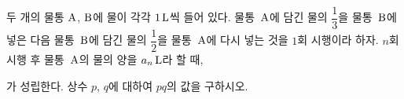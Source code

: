 두 개의 물통 $\mathrm{A}$, $\mathrm{B}$에 물이 각각 $1\mkern3mu \mathrm{L}$씩 들어 있다. 물통~$\mathrm{A}$에 담긴 물의 $\dfrac{1}{3}$을 물통~$\mathrm{B}$에 넣은 다음 물통~$\mathrm{B}$에 담긴 물의 $\dfrac{1}{2}$을 물통~$\mathrm{A}$에 다시 넣는 것을 $1$회 시행이라 하자. $n$회 시행 후 물통~$\mathrm{A}$의 물의 양을 $a_n\mkern3mu \mathrm{L}$라 할 때,\par\smallskip{}\par\smallskip\noindent 가 성립한다. 상수 $p$, $q$에 대하여 $pq$의 값을 구하시오.
